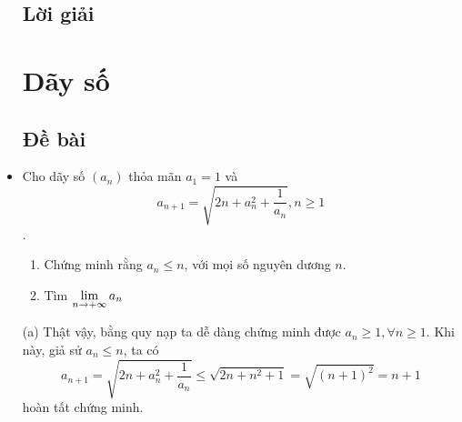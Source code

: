 \documentclass[11pt]{scrartcl}
\begin{document}
\begin{itemize}[label=, leftmargin=0em, itemsep=0.5em]
    \subsection{\LARGE \textcolor{dk}{Lời giải}}
    \newpage
    \thispagestyle{plain}
    
    \section{\huge Dãy số}
    \subsection{\LARGE \textcolor{dk}{Đề bài}}
    \item \begin{bt}
        Cho dãy số $(a_n)$ thỏa mãn $a_1 = 1$ và $$a_{n + 1} = \sqrt{2n + a_n^2 + \frac{1}{a_n}}, n \geq 1$$.
        \begin{enumerate}[label=(\alph*)]
            \item Chứng minh rằng $a_n \leq n$, với mọi số nguyên dương $n$.
            \item Tìm $\displaystyle\lim_{n \to +\infty} a_n$
        \end{enumerate}
    \end{bt}
    \begin{sol}
        (a) Thật vậy, bằng quy nạp ta dễ dàng chứng minh được $a_n \geq 1, \forall n \geq 1$. Khi này, giả sử $a_{n} \leq n$, ta có 
        \[
            a_{n + 1} = \sqrt{2n + a_n^2 + \frac{1}{a_n}} \leq \sqrt{2n + n^2 + 1 } = \sqrt{(n + 1)^2} = n + 1
        \]
        hoàn tất chứng minh.


\end{sol}
\end{itemize}
\end{document}
